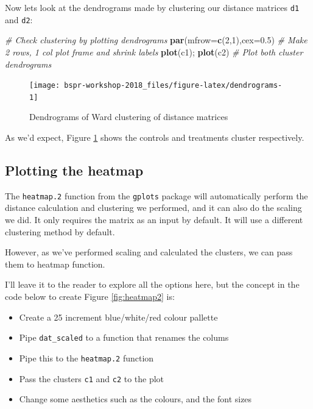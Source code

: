 \documentclass[12pt,]{book}
\newenvironment{Shaded}{\begin{snugshade}}{\end{snugshade}}
\newcommand{\CommentTok}[1]{\textcolor[rgb]{0.56,0.35,0.01}{\textit{#1}}}
\newcommand{\DataTypeTok}[1]{\textcolor[rgb]{0.13,0.29,0.53}{#1}}
\newcommand{\DecValTok}[1]{\textcolor[rgb]{0.00,0.00,0.81}{#1}}
\newcommand{\FloatTok}[1]{\textcolor[rgb]{0.00,0.00,0.81}{#1}}
\newcommand{\KeywordTok}[1]{\textcolor[rgb]{0.13,0.29,0.53}{\textbf{#1}}}
\newcommand{\NormalTok}[1]{#1}
\providecommand{\tightlist}{%
  \setlength{\itemsep}{0pt}\setlength{\parskip}{0pt}}
\begin{document}
Now lets look at the dendrograms made by
clustering our distance matrices \texttt{d1} and \texttt{d2}:



\begin{Shaded}
\begin{Highlighting}[]
\CommentTok{# Check clustering by plotting dendrograms}
\KeywordTok{par}\NormalTok{(}\DataTypeTok{mfrow=}\KeywordTok{c}\NormalTok{(}\DecValTok{2}\NormalTok{,}\DecValTok{1}\NormalTok{),}\DataTypeTok{cex=}\FloatTok{0.5}\NormalTok{) }\CommentTok{# Make 2 rows, 1 col plot frame and shrink labels}
\KeywordTok{plot}\NormalTok{(c1); }\KeywordTok{plot}\NormalTok{(c2) }\CommentTok{# Plot both cluster dendrograms}
\end{Highlighting}
\end{Shaded}

\begin{figure}

{\centering \texttt{[image: bspr-workshop-2018\_files/figure-latex/dendrograms-1]} 

}

\caption{Dendrograms of Ward clustering of distance matrices}\label{fig:dendrograms}
\end{figure}

As we'd expect, Figure \ref{fig:dendrograms} shows the controls and treatments
cluster respectively.

\hypertarget{plotting-the-heatmap}{%
\subsection{Plotting the heatmap}\label{plotting-the-heatmap}}

The \texttt{heatmap.2} function from the \texttt{gplots} package will automatically perform
the distance calculation and clustering we performed, and it can also do
the scaling we did. It only requires the matrix as an input by default. It will
use a different clustering method by default.

However, as we've performed scaling and calculated the clusters, we can pass
them to heatmap function.

I'll leave it to the reader to explore all the options here, but the concept in
the code below to create Figure \ref{fig:heatmap2} is:

\begin{itemize}
\tightlist
\item
  Create a 25 increment blue/white/red colour pallette
\item
  Pipe \texttt{dat\_scaled} to a function that renames the colums
\item
  Pipe this to the \texttt{heatmap.2} function
\item
  Pass the clusters \texttt{c1} and \texttt{c2} to the plot
\item
  Change some aesthetics such as the colours, and the font sizes
\end{itemize}
\end{document}
